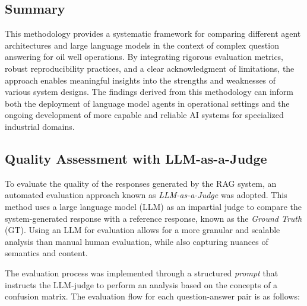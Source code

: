         \subsection{Summary}

            This methodology provides a systematic framework for comparing different agent architectures and large language models in the context of complex question answering for oil well operations. By integrating rigorous evaluation metrics, robust reproducibility practices, and a clear acknowledgment of limitations, the approach enables meaningful insights into the strengths and weaknesses of various system designs. The findings derived from this methodology can inform both the deployment of language model agents in operational settings and the ongoing development of more capable and reliable AI systems for specialized industrial domains.


        \subsection{Quality Assessment with LLM-as-a-Judge}
            \label{sec:llm_judge_evaluation}

            To evaluate the quality of the responses generated by the RAG system, an automated evaluation approach known as \textit{LLM-as-a-Judge} \citep{Zheng2023} was adopted. This method uses a large language model (LLM) as an impartial judge to compare the system-generated response with a reference response, known as the \textit{Ground Truth} (GT). Using an LLM for evaluation allows for a more granular and scalable analysis than manual human evaluation, while also capturing nuances of semantics and content.

            The evaluation process was implemented through a structured \textit{prompt} that instructs the LLM-judge to perform an analysis based on the concepts of a confusion matrix. The evaluation flow for each question-answer pair is as follows:

